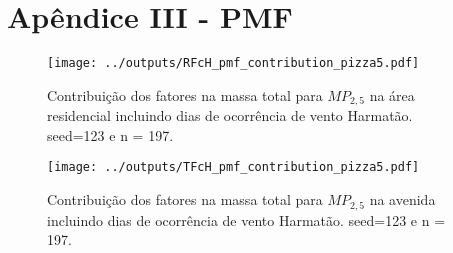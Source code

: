 \section{Apêndice III - PMF}

\begin{landscape}
  \begin{figure}
    \centering
    \begin{minipage}[b]{0.45\linewidth}
      \texttt{[image: ../outputs/RFcH\_pmf\_contribution\_pizza5.pdf]}
      \caption{Contribuição dos fatores na massa total para $MP_{2,5}$ na área
               residencial incluindo dias de ocorrência de vento Harmatão. seed=123 e n = 197.
               \label{table:RFcH_contribution5}}
    \end{minipage}%
    \hspace{0.5cm}
    \begin{minipage}[b]{0.45\linewidth}
      
    \end{minipage}
  \end{figure}
\end{landscape}

\begin{landscape}
  \begin{figure}
    \centering
    \begin{minipage}[b]{0.45\linewidth}
      \texttt{[image: ../outputs/TFcH\_pmf\_contribution\_pizza5.pdf]}
      \caption{Contribuição dos fatores na massa total para $MP_{2,5}$ na avenida
               incluindo dias de ocorrência de vento Harmatão. seed=123 e n = 197.
               \label{table:TFcH_contribution5}}
    \end{minipage}%
    \hspace{0.5cm}
    \begin{minipage}[b]{0.45\linewidth}
      
    \end{minipage}
  \end{figure}
\end{landscape}


